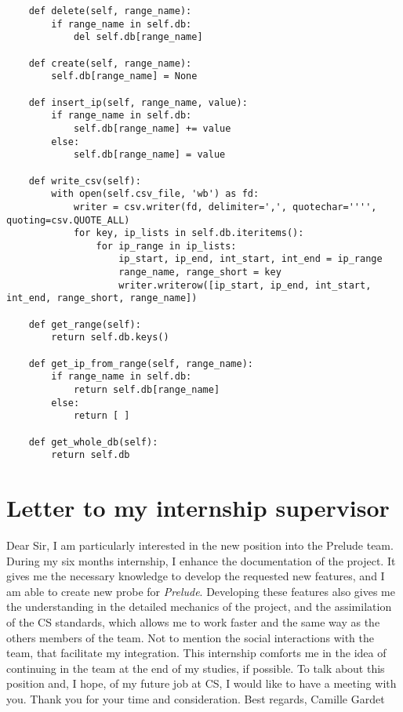 \documentclass{koala-en}
\begin{document}
\begin{lstlisting}
    def delete(self, range_name):
        if range_name in self.db:
            del self.db[range_name]

    def create(self, range_name):
        self.db[range_name] = None

    def insert_ip(self, range_name, value):
        if range_name in self.db:
            self.db[range_name] += value
        else:
            self.db[range_name] = value

    def write_csv(self):
        with open(self.csv_file, 'wb') as fd:
            writer = csv.writer(fd, delimiter=',', quotechar='''', quoting=csv.QUOTE_ALL)
            for key, ip_lists in self.db.iteritems():
                for ip_range in ip_lists:
                    ip_start, ip_end, int_start, int_end = ip_range
                    range_name, range_short = key
                    writer.writerow([ip_start, ip_end, int_start, int_end, range_short, range_name])

    def get_range(self):
        return self.db.keys()

    def get_ip_from_range(self, range_name):
        if range_name in self.db:
            return self.db[range_name]
        else:
            return [ ]

    def get_whole_db(self):
        return self.db

\end{lstlisting}

\thispagestyle{fancy}

\part{Letter to my internship supervisor}
Dear Sir,
\newline
\newline
I am particularly interested in the new position into the Prelude team.
\newline
\newline
During my six months internship, I enhance the documentation of the project. It gives me the necessary knowledge to develop the requested new features, and I am able to create new probe for \emph{Prelude}.
\newline
Developing these features also gives me the understanding in the detailed mechanics of the project, and the assimilation of the CS standards, which allows me to work faster and the same way as the others members of the team. Not to mention the social interactions with the team, that facilitate my integration.
\newline
\newline
This internship comforts me in the idea of continuing in the team at the end of my studies, if possible.
\newline
\newline
To talk about this position and, I hope, of my future job at CS, I would like to have a meeting with you.
\newline
\newline
Thank you for your time and consideration.
\newline
\newline
Best regards,\newline
Camille Gardet
\end{document}
